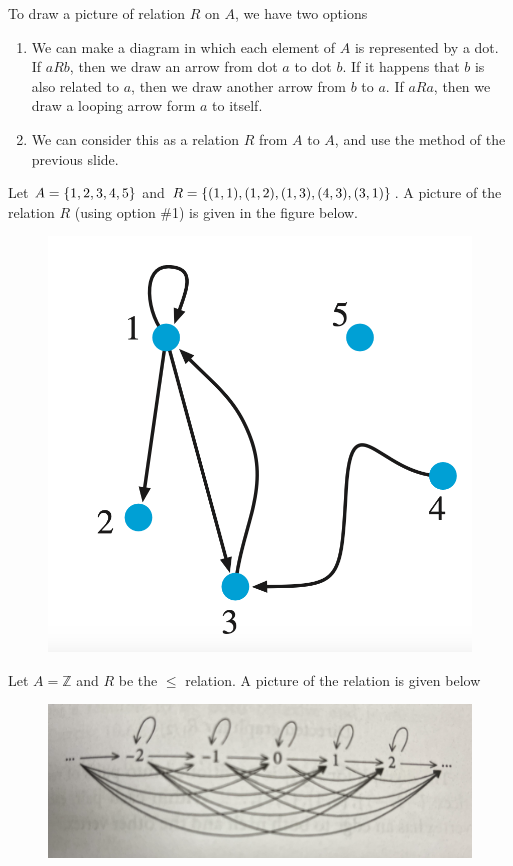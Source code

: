 \documentclass[10pt]{beamer}
\begin{document}
\begin{frame}

\begin{myredbox}[title=Drawing relations on $A$]
 To draw a picture of relation $R$ on $A$, we have two options
 \begin{enumerate}
  	\item We can make a diagram in which each element of $A$ is represented by a dot.  If $aRb$, then we draw an arrow from dot $a$ to dot $b$.  If it happens that $b$ is also related to $a$, then we draw another arrow from $b$ to $a$. If $aRa$, then we draw a looping arrow form $a$ to itself.
 	\item We can consider this as a relation $R$ from $A$ to $A$, and use the method of the previous slide.
 \end{enumerate}
 \end{myredbox}
 
\begin{mygreenbox}[title=Example]
Let $A = \{ {1,2,3,4,5} \}$ and $R=\{ {(1,1), (1,2), (1,3), (4,3), (3,1)} \}$. A picture of the relation $R$ (using option \#1) is given in the figure below.  
 
 \begin{figure}
\includegraphics[width=.2\textwidth]{images/relations_on_A} 
\end{figure}

\end{mygreenbox}
 


\end{frame}



\begin{frame}

\begin{mygreenbox}[title=An Example Using a Set with Infinitely Many Elements]
Let $A = \mathbb{Z}$ and $R$ be the $\leq$ relation.  A picture of the relation is given below 
 \begin{figure}
\includegraphics[width=\textwidth]{images/leq} 
\end{figure}

\end{mygreenbox}
 


\end{frame}
\end{document}
